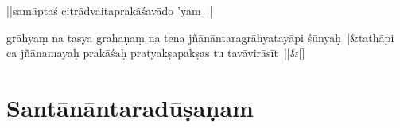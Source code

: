 \documentclass[article,12pt,a4paper]{memoir}%
\newcounter{parCount}
\begin{document}
	  \pstart \leavevmode%
	||samāptaś citrādvaitaprakāśavādo 'yam ||
	{}
	\pend%
      
	    
	    \stanza[\smallbreak]
	  grāhyaṃ na tasya grahaṇaṃ na tena jñānāntaragrāhyatayāpi śūnyaḥ |&tathāpi ca jñānamayaḥ prakāśaḥ pratyakṣapakṣas tu tavāvirāsīt ||\&[\smallbreak]
	  
	  
	  
	    
	    \endnumbering%
	    \endgroup
	    
	  
	  
	
	    
	    \begingroup
	    \beginnumbering%
	    
	  
\chapter*[{Santānāntaradūṣaṇam}]{Santānāntaradūṣaṇam}\label{Santānāntaradūṣaṇam}
\end{document}
